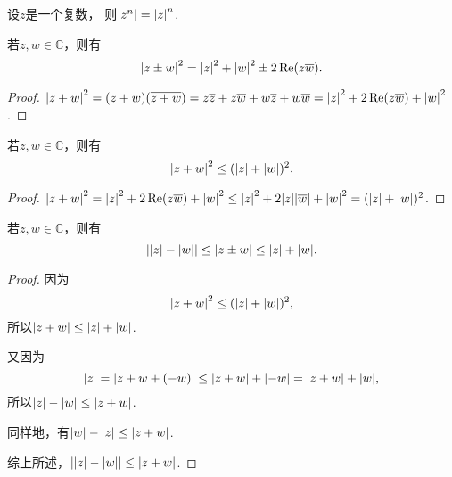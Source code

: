 \begin{property}
设\(z\)是一个复数，
则\(
	\abs{z^n}
	= \abs{z}^n
\).
\end{property}

\begin{theorem}
若\(z,w \in \mathbb{C}\)，则有\begin{equation}
	\abs{z \pm w}^2
	= \abs{z}^2 + \abs{w}^2 \pm 2 \Re(z \overline{w}).
\end{equation}
\begin{proof}
\(
	\abs{z + w}^2
	= (z + w) (\overline{z + w})
	= z\overline{z}
		+ z\overline{w}
		+ w\overline{z}
		+ w\overline{w}
	= \abs{z}^2 + 2 \Re(z\overline{w}) + \abs{w}^2
\).
\end{proof}
\end{theorem}

\begin{theorem}
若\(z,w \in \mathbb{C}\)，则有\begin{equation}
	\abs{z + w}^2 \leq (\abs{z} + \abs{w})^2.
\end{equation}
\begin{proof}
\(
	\abs{z + w}^2
	= \abs{z}^2 + 2 \Re(z \overline{w}) + \abs{w}^2
	\leq \abs{z}^2 + 2 \abs{z}\abs{\overline{w}} + \abs{w}^2
	= (\abs{z} + \abs{w})^2
\).
\end{proof}
\end{theorem}

\begin{theorem}%
若\(z,w \in \mathbb{C}\)，则有\begin{equation}
	\abs{\abs{z} - \abs{w}}
	\leq
	\abs{z \pm w}
	\leq
	\abs{z} + \abs{w}.
\end{equation}
\begin{proof}
因为\begin{equation*}
	\abs{z + w}^2 \leq (\abs{z} + \abs{w})^2,
\end{equation*}
所以\(\abs{z + w} \leq \abs{z} + \abs{w}\).

又因为\begin{equation*}
	\abs{z}
	= \abs{z + w + (-w)} \leq \abs{z+w} + \abs{-w}
	= \abs{z+w} + \abs{w},
\end{equation*}
所以\(\abs{z}-\abs{w} \leq \abs{z+w}\).

同样地，有\(\abs{w}-\abs{z} \leq \abs{z+w}\).

综上所述，\(\abs{\abs{z}-\abs{w}}\leq\abs{z+w}\).
\end{proof}
\end{theorem}

